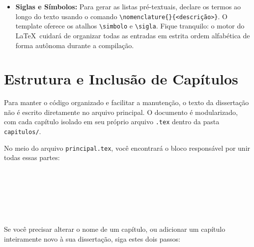 \documentclass[a4paper,12pt]{article}
\begin{document}
\begin{itemize}
\begin{atencao}
    \textbf{Começando sua bibliografia do zero (base limpa):}\\
    As referências que acompanham o arquivo padrão \texttt{bibliografia/referencias.bib} são apenas exemplos didáticos incluídos para demonstrar a formatação da norma do PPGT. Quando for escrever a sua dissertação real, \textbf{você pode apagar todo o conteúdo daquele arquivo} e colar diretamente as referências exportadas do seu gerenciador (Zotero, Mendeley, etc.). Apenas lembre-se de remover ou substituir as citações de teste usadas no texto dos capítulos para não gerar avisos de chaves não encontradas.
    \end{atencao}
    
    \item \textbf{Siglas e Símbolos:} Para gerar as listas pré-textuais, declare os termos ao longo do texto usando o comando \texttt{\textbackslash nomenclature\{<símbolo ou sigla>\}\{<descrição>\}}. O template oferece os atalhos \texttt{\textbackslash simbolo} e \texttt{\textbackslash sigla}. Fique tranquilo: o motor do \LaTeX \ cuidará de organizar todas as entradas em estrita ordem alfabética de forma autônoma durante a compilação.
\end{itemize}

\section{Estrutura e Inclusão de Capítulos}

Para manter o código organizado e facilitar a manutenção, o texto da dissertação não é escrito diretamente no arquivo principal. O documento é modularizado, com cada capítulo isolado em seu próprio arquivo \texttt{.tex} dentro da pasta \texttt{capitulos/}.

No meio do arquivo \texttt{principal.tex}, você encontrará o bloco responsável por unir todas essas partes:

\begin{verbatim}
  
  
  
  
  
\end{verbatim}

Se você precisar alterar o nome de um capítulo, ou adicionar um capítulo inteiramente novo à sua dissertação, siga estes dois passos:
\end{document}
